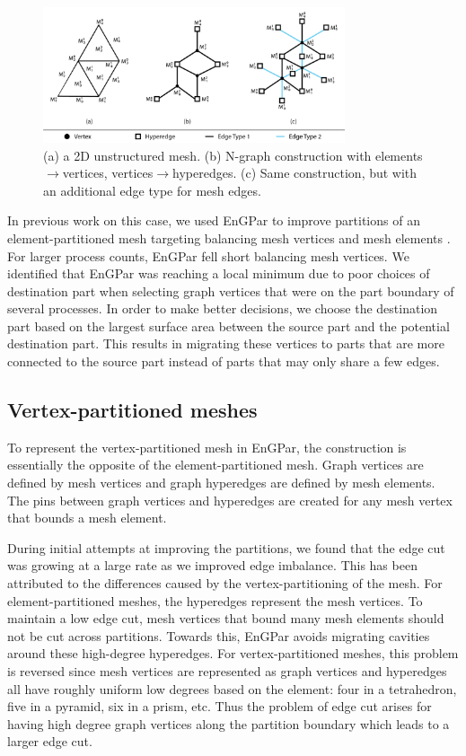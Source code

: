 \documentclass[conference]{IEEEtran}
\begin{document}
\begin{figure}[!ht]
  \centering
  \includegraphics[width=3.5in]{../figures/exampleMesh2Graph.png}
  \caption{(a) a 2D unstructured mesh. (b) N-graph construction with elements$\rightarrow$vertices, vertices$\rightarrow$hyperedges. (c) Same construction, but with an additional edge type for mesh edges.}
  \label{fig:mesh2graph}
\end{figure}

In previous work on this case, we used EnGPar to improve partitions of an
element-partitioned mesh targeting balancing mesh vertices and mesh elements \cite{engparSC17}.
For larger process counts, EnGPar fell short balancing mesh vertices.
We identified that EnGPar was reaching a local minimum due to poor choices of destination part
when selecting graph vertices that were on the part boundary of several processes. In order
to make better decisions, we choose the destination part based on the largest surface area
between the source part and the potential destination part. This results in migrating these
vertices to parts that are more connected to the source part instead of parts that may only
share a few edges.

\subsection{Vertex-partitioned meshes}

To represent the vertex-partitioned mesh in EnGPar, the construction
is essentially the opposite of the element-partitioned mesh. Graph
vertices are defined by mesh vertices and graph hyperedges are defined
by mesh elements. The pins between graph vertices and hyperedges are
created for any mesh vertex that bounds a mesh element.


During initial attempts at improving the partitions, we found that the edge cut was growing
at a large rate as we improved edge imbalance. This has been attributed to the differences
caused by the vertex-partitioning of the mesh. For element-partitioned meshes, the hyperedges
represent the mesh vertices. To maintain a low edge cut, mesh vertices that bound many mesh
elements should not be cut across partitions. Towards this, EnGPar avoids migrating cavities
around these high-degree hyperedges. For vertex-partitioned meshes, this problem is reversed
since mesh vertices are represented as graph vertices and hyperedges all have roughly uniform
low degrees based on the element: four in a tetrahedron, five in a pyramid, six in a prism, etc.
Thus the problem of edge cut arises for having high degree graph vertices along the partition
boundary which leads to a larger edge cut.
\end{document}
